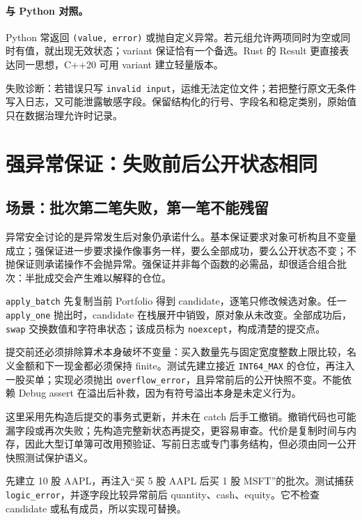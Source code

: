 \paragraph{与 Python 对照。}
Python 常返回 \texttt{(value, error)} 或抛自定义异常。若元组允许两项同时为空或同时有值，就出现无效状态；variant 保证恰有一个备选。Rust 的 Result 更直接表达同一思想，C++20 可用 variant 建立轻量版本。

失败诊断：若错误只写 \texttt{invalid input}，运维无法定位文件；若把整行原文无条件写入日志，又可能泄露敏感字段。保留结构化的行号、字段名和稳定类别，原始值只在数据治理允许时记录。

\section{强异常保证：失败前后公开状态相同}

\subsection{场景：批次第二笔失败，第一笔不能残留}

异常安全讨论的是异常发生后对象仍承诺什么。基本保证要求对象可析构且不变量成立；强保证进一步要求操作像事务一样，要么全部成功，要么公开状态不变；不抛保证则承诺操作不会抛异常。强保证并非每个函数的必需品，却很适合组合批次：半批成交会产生难以解释的仓位。



\texttt{apply\_batch} 先复制当前 Portfolio 得到 candidate，逐笔只修改候选对象。任一 \texttt{apply\_one} 抛出时，candidate 在栈展开中销毁，原对象从未改变。全部成功后，\texttt{swap} 交换数值和字符串状态；该成员标为 \texttt{noexcept}，构成清楚的提交点。

提交前还必须排除算术本身破坏不变量：买入数量先与固定宽度整数上限比较，名义金额和下一现金都必须保持 finite。测试先建立接近 \texttt{INT64\_MAX} 的仓位，再注入一股买单；实现必须抛出 \texttt{overflow\_error}，且异常前后的公开快照不变。不能依赖 Debug assert 在溢出后补救，因为有符号溢出本身是未定义行为。

这里采用先构造后提交的事务式更新，并未在 catch 后手工撤销。撤销代码也可能漏字段或再次失败；先构造完整新状态再提交，更容易审查。代价是复制时间与内存，因此大型订单簿可改用预验证、写前日志或专门事务结构，但必须由同一公开快照测试保护语义。

 先建立 10 股 AAPL，再注入“买 5 股 AAPL 后买 1 股 MSFT”的批次。测试捕获 \texttt{logic\_error}，并逐字段比较异常前后 quantity、cash、equity。它不检查 candidate 或私有成员，所以实现可替换。

